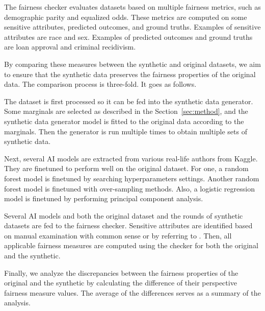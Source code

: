 \documentclass[manuscript,screen,review,anonymous]{acmart}
\begin{document}
The fairness checker evaluates datasets based on multiple fairness metrics, such as demographic parity and equalized odds. These metrics are computed on some sensitive attributes, predicted outcomes, and ground truths. Examples of sensitive attributes are race and sex. Examples of predicted outcomes and ground truths are loan approval and criminal recidivism.

By comparing these measures between the synthetic and original datasets, we aim to ensure that the synthetic data preserves the fairness properties of the original data. The comparison process is three-fold. It goes as follows.

The dataset is first processed so it can be fed into the synthetic data generator. Some marginals are selected as described in the Section~\ref{sec:method}, and the synthetic data generator model is fitted to the original data according to the marginals. Then the generator is run multiple times to obtain multiple sets of synthetic data.

Next, several AI models are extracted from various real-life authors from Kaggle. They are finetuned to perform well on the original dataset. For one, a random forest model is finetuned by searching hyperparameters settings\cite{Ipbyrne2023}. Another random forest model is finetuned with over-sampling methods\cite{Jawat2024}. Also, a logistic regression model is finetuned by performing principal component analysis\cite{Prashant1112023}.

Several AI models and both the original dataset and the rounds of synthetic datasets are fed to the fairness checker. Sensitive attributes are identified based on manual examination with common sense or by referring to \cite{pessach2022review}. Then, all applicable fairness measures are computed using the checker for both the original and the synthetic.

Finally, we analyze the discrepancies between the fairness properties of the original and the synthetic by calculating the difference of their perspective fairness measure values. The average of the differences serves as a summary of the analysis.

\end{document}
